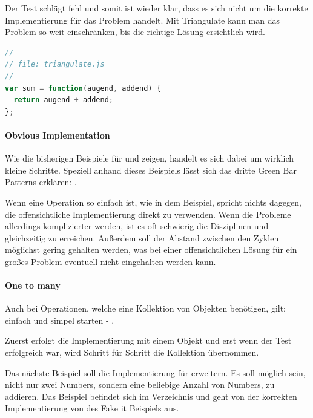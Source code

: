 {\begin{lstlisting}[language=JavaScript]
\end{lstlisting}
Der Test schlägt fehl und somit ist wieder klar, dass es sich nicht um die korrekte Implementierung für das Problem handelt. Mit Triangulate kann man das Problem so weit einschränken, bis die richtige Lösung ersichtlich wird.
\begin{lstlisting}[language=JavaScript]
//
// file: triangulate.js
//
var sum = function(augend, addend) {
  return augend + addend;
};
\end{lstlisting}

\paragraph{Obvious Implementation}

Wie die bisherigen Beispiele für  und  zeigen, handelt es sich dabei um wirklich kleine Schritte. Speziell anhand dieses Beispiels lässt sich das dritte Green Bar Patterns erklären: .

Wenn eine Operation so einfach ist, wie in dem Beispiel, spricht nichts dagegen, die offensichtliche Implementierung direkt zu verwenden.
Wenn die Probleme allerdings komplizierter werden, ist es oft schwierig die Disziplinen  und  gleichzeitig zu erreichen. Außerdem soll der Abstand zwischen den Zyklen möglichst gering gehalten werden, was bei einer offensichtlichen Lösung für ein großes Problem eventuell nicht eingehalten werden kann.

\paragraph{One to many}

Auch bei Operationen, welche eine Kollektion von Objekten benötigen, gilt: einfach und simpel starten - \autocite[154]{Beck:2003}.

Zuerst erfolgt die Implementierung mit einem Objekt und erst wenn der Test erfolgreich war, wird Schritt für Schritt die Kollektion übernommen.

Das nächste Beispiel soll die Implementierung für  erweitern. Es soll möglich sein, nicht nur zwei Numbers, sondern eine beliebige Anzahl von Numbers, zu addieren. Das Beispiel befindet sich im Verzeichnis  und geht von der korrekten Implementierung von  des Fake it Beispiels aus.

}
